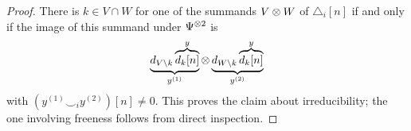 \begin{proof}
	There is $k \in V \cap W$ for one of the summands $V \otimes W$ of $\triangle_i [n]$ if and only if the image of this summand under $\Psi^{\otimes 2}$ is
	\[
	\underbrace{d_{V \setminus k} \overbrace{d_k[n]}^{y}}_{y^{(1)}}
	\otimes
	\underbrace{d_{W \setminus k} \overbrace{d_k[n]}^{y}}_{y^{(2)}}
	\]
	with $(y^{(1)} \smallsmile_i y^{(2)})[n] \neq 0$.
	This proves the claim about irreducibility; the one involving freeness follows from direct inspection.
\end{proof}